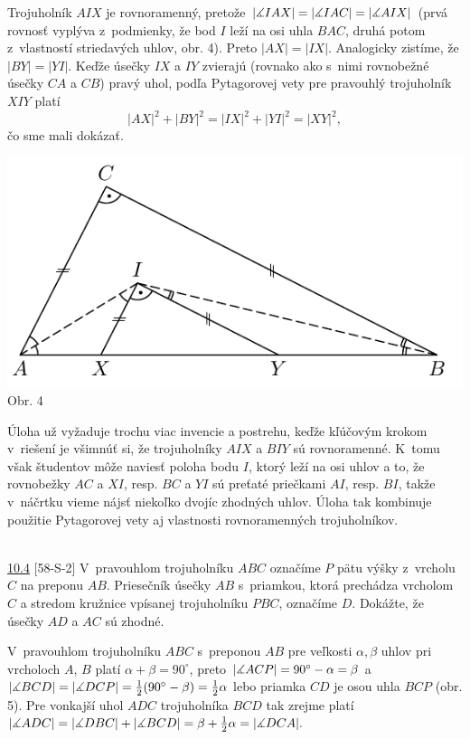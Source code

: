 \rieh Trojuholník $AIX$ je rovnoramenný, pretože $|\measuredangle IAX| = |\measuredangle IAC| = | \measuredangle AIX|$ (prvá rovnosť vyplýva z~podmienky, že bod $I$ leží na osi uhla $BAC$, druhá potom z~vlastností striedavých uhlov, obr. 4). Preto $|AX| = |IX|$. Analogicky zistíme, že $|BY | = |Y I|$. Keďže úsečky $IX$ a $IY$ zvierajú (rovnako ako s~nimi rovnobežné úsečky $CA$ a $CB$) pravý uhol, podľa Pytagorovej vety pre pravouhlý trojuholník $XIY$ platí $$|AX|^2+ |BY |^2= |IX|^2+ |Y I|^2= |XY |^2,$$
čo sme mali dokázať.
\begin{center}
\includegraphics{obrazky/63S3}\\

Obr. 4
\end{center}
\kom Úloha už vyžaduje trochu viac invencie a postrehu, keďže kľúčovým krokom v~riešení je všimnúť si, že trojuholníky $AIX$ a $BIY$ sú rovnoramenné. K~tomu však študentov môže naviesť poloha bodu $I$, ktorý leží na osi uhlov a to, že rovnobežky $AC$ a $XI$, resp. $BC$ a $YI$ sú preťaté priečkami $AI$, resp. $BI$, takže v~náčrtku vieme nájsť niekoľko dvojíc zhodných uhlov. Úloha tak kombinuje použitie Pytagorovej vety aj vlastnosti rovnoramenných trojuholníkov.\\
\\
\begin{tcolorbox}[breakable,notitle,boxrule=0pt,colback=light-gray,colframe=light-gray]\ul{10.4} [58-S-2]
 V~pravouhlom trojuholníku $ABC$ označíme $P$ pätu výšky z~vrcholu $C$ na preponu $AB$. Priesečník úsečky $AB$ s~priamkou, ktorá prechádza vrcholom $C$ a stredom kružnice vpísanej trojuholníku $PBC$, označíme $D$. Dokážte, že úsečky $AD$ a $AC$ sú zhodné.

\end{tcolorbox}

\rieh V~pravouhlom trojuholníku $ABC$ s~preponou $AB$ pre veľkosti $\alpha, \beta$ uhlov pri vrcholoch $A$, $B$ platí $\alpha+\beta= 90^\circ$, preto $|\measuredangle ACP| = 90^\circ -\alpha = \beta$ a $|\measuredangle BCD| = | \measuredangle DCP|= \frac{1}{2}(90^\circ -\beta) = \frac{1}{2}\alpha$ lebo priamka $CD$ je osou uhla $BCP$ (obr. 5). Pre vonkajší uhol $ADC$ trojuholníka $BCD$ tak zrejme platí $|\measuredangle ADC| = |\measuredangle DBC| + |\measuredangle BCD| = \beta  +\frac{1}{2}\alpha = |\measuredangle DCA|.$

